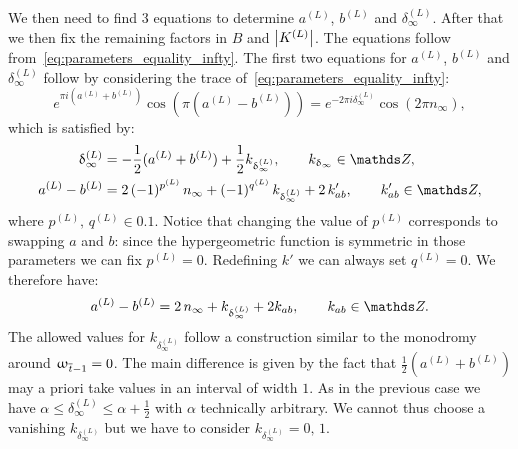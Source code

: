 We then need to find $3$ equations to determine $a^{(L)}$, $b^{(L)}$ and $\delta^{(L)}_{\infty}$.
After that we then fix the remaining factors in $B$ and $\abs{K^{(L)}}$.
The equations follow from~\eqref{eq:parameters_equality_infty}.
The first two equations for $a^{(L)}$, $b^{(L)}$ and $\delta^{(L)}_{\infty}$ follow by considering the trace of~\eqref{eq:parameters_equality_infty}:
\begin{equation}
  e^{\pi i ( a^{(L)} + b^{(L)} )} \cos(\pi( a^{(L)} - b^{(L)} ) )
  =
  e^{-2\pi i \delta^{(L)}_{\infty}} \cos(2\pi n_{\infty}),
\end{equation}
which is satisfied by:
\begin{equation}
  \begin{split}
    \delta^{(L)}_{\infty}
    & =
    -
    \frac{1}{2}(a^{(L)} + b^{(L)})
    +
    \frac{1}{2} k_{\delta^{(L)}_{\infty}},
    \qquad
    k_{\delta_{\infty}} \in \Z,
    \\
    a^{(L)} - b^{(L)}
    & =
    2\, (-1)^{p^{(L)}}\, n_{\infty}
    +
    (-1)^{q^{(L)}}\, k_{\delta^{(L)}_{\infty}}
    +
    2\, k'_{a b},
    \qquad
    k'_{ab} \in \Z,
  \end{split}
\end{equation}
where $p^{(L)},\, q^{(L)} \in \qty{ 0, 1 }$.
Notice that changing the value of $p^{(L)}$ corresponds to swapping $a$ and $b$: since the hypergeometric function is symmetric in those parameters we can fix $p^{(L)}=0$.
Redefining $k'$ we can always set $q^{(L)}=0$.
We therefore have:
\begin{equation}
  a^{(L)} - b^{(L)}
  =
  2\, n_{\infty}
  +
  k_{\delta^{(L)}_{\infty}}
  +
  2 k_{ab},
  \qquad
  k_{a b}\in \Z.
  \label{eq:aL-bL}
\end{equation}
The allowed values for $k_{\delta^{(L)}_{\infty}}$ follow a construction similar to the monodromy around $\upomega_{\overline{t}-1} = 0$.
The main difference is given by the fact that $\frac{1}{2}(a^{(L)} + b^{(L)})$  may a priori take values in an interval of width $1$.
As in the previous case we have $\alpha \le \delta_{\infty}^{(L)} \le \alpha + \frac{1}{2}$ with $\alpha$ technically arbitrary.
We cannot thus choose a vanishing $k_{\delta^{(L)}_{\infty}}$ but we have to consider $k_{\delta^{(L)}_{\infty}} = 0,\, 1$.

